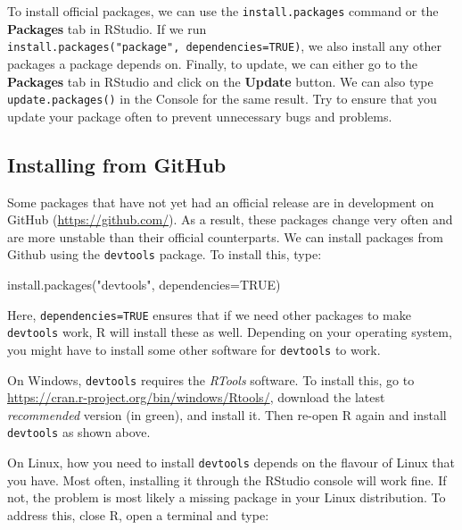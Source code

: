 \documentclass[
]{article}
\newenvironment{Shaded}{\begin{snugshade}}{\end{snugshade}}
\newcommand{\AttributeTok}[1]{\textcolor[rgb]{0.77,0.63,0.00}{#1}}
\newcommand{\ConstantTok}[1]{\textcolor[rgb]{0.00,0.00,0.00}{#1}}
\newcommand{\FunctionTok}[1]{\textcolor[rgb]{0.00,0.00,0.00}{#1}}
\newcommand{\NormalTok}[1]{#1}
\newcommand{\StringTok}[1]{\textcolor[rgb]{0.31,0.60,0.02}{#1}}
\begin{document}
To install official packages, we can use the \texttt{install.packages} command or the \textbf{Packages} tab in RStudio. If we run \texttt{install.packages("package",\ dependencies=TRUE)}, we also install any other packages a package depends on. Finally, to update, we can either go to the \textbf{Packages} tab in RStudio and click on the \textbf{Update} button. We can also type \texttt{update.packages()} in the Console for the same result. Try to ensure that you update your package often to prevent unnecessary bugs and problems.

\hypertarget{installing-from-github}{%
\subsection{Installing from GitHub}\label{installing-from-github}}

Some packages that have not yet had an official release are in development on GitHub (\url{https://github.com/}). As a result, these packages change very often and are more unstable than their official counterparts. We can install packages from Github using the \texttt{devtools} package. To install this, type:

\begin{Shaded}
\begin{Highlighting}[]
\FunctionTok{install.packages}\NormalTok{(}\StringTok{"devtools"}\NormalTok{, }\AttributeTok{dependencies=}\ConstantTok{TRUE}\NormalTok{)}
\end{Highlighting}
\end{Shaded}

Here, \texttt{dependencies=TRUE} ensures that if we need other packages to make \texttt{devtools} work, R will install these as well. Depending on your operating system, you might have to install some other software for \texttt{devtools} to work.

On Windows, \texttt{devtools} requires the \emph{RTools} software. To install this, go to \url{https://cran.r-project.org/bin/windows/Rtools/}, download the latest \emph{recommended} version (in green), and install it. Then re-open R again and install \texttt{devtools} as shown above.

On Linux, how you need to install \texttt{devtools} depends on the flavour of Linux that you have. Most often, installing it through the RStudio console will work fine. If not, the problem is most likely a missing package in your Linux distribution. To address this, close R, open a terminal and type:
\end{document}
